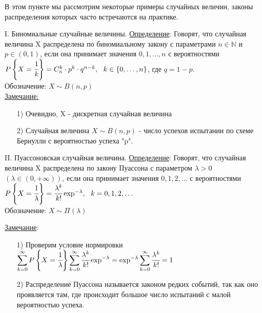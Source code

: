 
В этом пункте мы рассмотрим некоторые примеры случайных величин, законы распределения которых часто встречаются на практике.

I. Биномиальные случайные величины.
\underline{Определение}: Говорят, что случайная величина X распределена по биномиальному закону с параметрами $n \in \mathbb{N}$ и $p \in (0,1)$, если она принимает значения $0,1, \ldots, n$ с вероятностями \\
$P\left\{ X = \cfrac{1}{k} \right\} = C^k_n \cdot p^k \cdot q^{n-k}, \ \ k \in \{0, \ldots, n\}$, где $q = 1 - p$. \\
Обозначение: $X \sim B(n,p)$ \\%

\underline{Замечание:} 
\begin{enumerate}
	\item[1)] 
	Очевидно, X - дискретная случайная величина %
				
	\item[2)] 
	Случайная величина $X \sim B(n,p)$ - число успехов испытании по схеме Бернулли с вероятностью успеха "p".
\end{enumerate}


II. Пуассоновская случайная величина.
\underline{Определение}: Говорят, что случайная величина X распределена по закону Пуассона с параметром $\lambda > 0$ \\
$(\lambda \in (0, +\infty))$, если она принимает значения $0, 1, 2, \ldots$ с вероятностями \\
$P\left\{X = \cfrac{1}{\lambda}\right\} = \cfrac{\lambda^k}{k!} \exp^{-\lambda}, \ \ k = 0, 1, 2, \ldots$ \\
Обозначение: $X \sim \Pi (\lambda)$

\underline{Замечание}:
\begin{enumerate}
	\item[1)]
	Проверим условие нормировки \\
	$\displaystyle \sum\limits_{k = 0}^{\infty} P\left\{X = \cfrac{1}{\lambda} \right\} \sum\limits_{k = 0}^{\infty} \cfrac{\lambda^k}{k!} \exp^{-\lambda} = \exp^{-\lambda} \sum\limits_{k = 0}^{\infty} \cfrac{\lambda^k}{k!} = 1$
	
	\item[2)]
	Распределение Пуассона называется законом редких событий, так как оно проявляется там, где происходит большое число испытаний с малой вероятностью успеха.
\end{enumerate}

